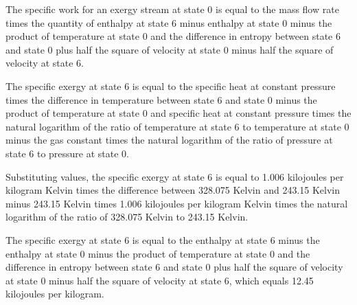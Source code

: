 The specific work for an exergy stream at state 0 is equal to the mass flow rate times the quantity of enthalpy at state 6 minus enthalpy at state 0 minus the product of temperature at state 0 and the difference in entropy between state 6 and state 0 plus half the square of velocity at state 0 minus half the square of velocity at state 6.

The specific exergy at state 6 is equal to the specific heat at constant pressure times the difference in temperature between state 6 and state 0 minus the product of temperature at state 0 and specific heat at constant pressure times the natural logarithm of the ratio of temperature at state 6 to temperature at state 0 minus the gas constant times the natural logarithm of the ratio of pressure at state 6 to pressure at state 0.

Substituting values, the specific exergy at state 6 is equal to 1.006 kilojoules per kilogram Kelvin times the difference between 328.075 Kelvin and 243.15 Kelvin minus 243.15 Kelvin times 1.006 kilojoules per kilogram Kelvin times the natural logarithm of the ratio of 328.075 Kelvin to 243.15 Kelvin.

The specific exergy at state 6 is equal to the enthalpy at state 6 minus the enthalpy at state 0 minus the product of temperature at state 0 and the difference in entropy between state 6 and state 0 plus half the square of velocity at state 0 minus half the square of velocity at state 6, which equals 12.45 kilojoules per kilogram.